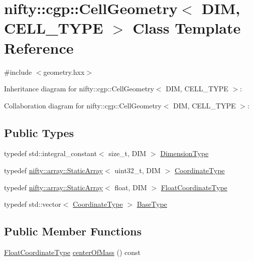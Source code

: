 \hypertarget{classnifty_1_1cgp_1_1CellGeometry}{}\section{nifty\+:\+:cgp\+:\+:Cell\+Geometry$<$ D\+I\+M, C\+E\+L\+L\+\_\+\+T\+Y\+P\+E $>$ Class Template Reference}
\label{classnifty_1_1cgp_1_1CellGeometry}


{\ttfamily \#include $<$geometry.\+hxx$>$}



Inheritance diagram for nifty\+:\+:cgp\+:\+:Cell\+Geometry$<$ D\+I\+M, C\+E\+L\+L\+\_\+\+T\+Y\+P\+E $>$\+:


Collaboration diagram for nifty\+:\+:cgp\+:\+:Cell\+Geometry$<$ D\+I\+M, C\+E\+L\+L\+\_\+\+T\+Y\+P\+E $>$\+:
\subsection*{Public Types}
\begin{DoxyCompactItemize}
\item 
typedef std\+::integral\+\_\+constant$<$ size\+\_\+t, D\+I\+M $>$ \hyperlink{classnifty_1_1cgp_1_1CellGeometry_a8cc75c7033c03864e099a5d907de88d8}{Dimension\+Type}
\item 
typedef \hyperlink{namespacenifty_1_1array_a683f151f19c851754e0c6d55ed16a0c2}{nifty\+::array\+::\+Static\+Array}$<$ uint32\+\_\+t, D\+I\+M $>$ \hyperlink{classnifty_1_1cgp_1_1CellGeometry_af8ae7d6b7a8f20afae6ce53e88604acf}{Coordinate\+Type}
\item 
typedef \hyperlink{namespacenifty_1_1array_a683f151f19c851754e0c6d55ed16a0c2}{nifty\+::array\+::\+Static\+Array}$<$ float, D\+I\+M $>$ \hyperlink{classnifty_1_1cgp_1_1CellGeometry_a07e98f74f6dc5cda1aab1349c7f60d5b}{Float\+Coordinate\+Type}
\item 
typedef std\+::vector$<$ \hyperlink{classnifty_1_1cgp_1_1CellGeometry_af8ae7d6b7a8f20afae6ce53e88604acf}{Coordinate\+Type} $>$ \hyperlink{classnifty_1_1cgp_1_1CellGeometry_ada76b5372b0e456edf3496813b9ed7f0}{Base\+Type}
\end{DoxyCompactItemize}
\subsection*{Public Member Functions}
\begin{DoxyCompactItemize}
\item 
\hyperlink{classnifty_1_1cgp_1_1CellGeometry_a07e98f74f6dc5cda1aab1349c7f60d5b}{Float\+Coordinate\+Type} \hyperlink{classnifty_1_1cgp_1_1CellGeometry_af51fef28bad6333d7604a160e5353188}{center\+Of\+Mass} () const 
\end{DoxyCompactItemize}


